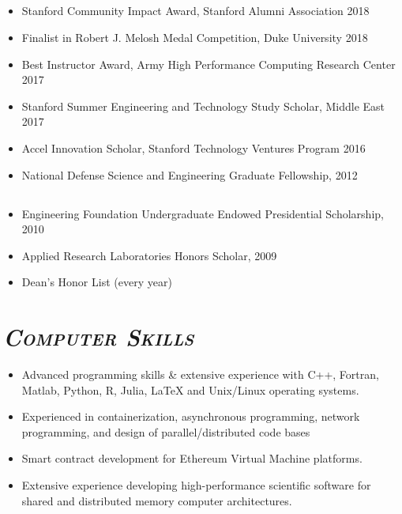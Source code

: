 \documentclass[10pt]{article}
\begin{document}
\subsection*{\sl \normalsize \underline{}} 
\begin{itemize}
	\setlength{\itemsep}{0pt}
	\setlength{\parskip}{0pt}
	\item Stanford Community Impact Award, Stanford Alumni Association 2018
	\item Finalist in Robert J. Melosh Medal Competition, Duke University 2018
	\item Best Instructor Award, Army High Performance Computing Research Center 2017
	\item Stanford Summer Engineering and Technology Study Scholar, Middle East 2017
	\item Accel Innovation Scholar, Stanford Technology Ventures Program 2016
	\item National Defense Science and Engineering Graduate Fellowship, 2012
\end{itemize}

\subsection*{\sl \normalsize \underline{}}
\begin{itemize}
	\setlength{\itemsep}{0pt}
	\setlength{\parskip}{0pt}
	\item Engineering Foundation Undergraduate Endowed Presidential Scholarship, 2010 	
	\item Applied Research Laboratories Honors Scholar, 2009 
	\item Dean's Honor List (every year) 
\end{itemize}

\section*{\sl {\bfseries{\textsc{\large Computer Skills}}}}
\begin{itemize}
	\setlength{\itemsep}{0pt}
	\setlength{\parskip}{0pt}
	\item Advanced programming skills \& extensive experience with C++, Fortran, Matlab, Python, R, Julia, LaTeX and Unix/Linux operating systems. 
	\item Experienced in containerization, asynchronous programming, network programming, and design of parallel/distributed code bases
    \item Smart contract development for Ethereum Virtual Machine platforms. 
	\item Extensive experience developing high-performance scientific software for shared and distributed memory computer architectures. 
\end{itemize}
\end{document}
